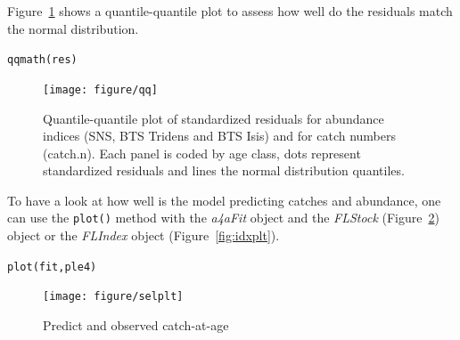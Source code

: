 \documentclass[a4paper,english,10pt]{article}\usepackage[]{graphicx}\usepackage[]{color}
\makeatletter
\newcommand{\hlstd}[1]{\textcolor[rgb]{0,0,0}{#1}}%
\newcommand{\hlkwd}[1]{\textcolor[rgb]{0.361,0.506,0.596}{#1}}%
\newenvironment{kframe}{%
 \def\at@end@of@kframe{}%
 \ifinner\ifhmode%
  \def\at@end@of@kframe{\end{minipage}}%
  \begin{minipage}{\columnwidth}%
 \fi\fi%
 \def\FrameCommand##1{\hskip\@totalleftmargin \hskip-\fboxsep
 \colorbox{shadecolor}{##1}\hskip-\fboxsep
     \hskip-\linewidth \hskip-\@totalleftmargin \hskip\columnwidth}%
 \MakeFramed {\advance\hsize-\width
   \@totalleftmargin\z@ \linewidth\hsize
   \@setminipage}}%
 {\par\unskip\endMakeFramed%
 \at@end@of@kframe}
\newenvironment{knitrout}{}{} %
\newcommand{\code}[1]{{\texttt{#1}}}
\newcommand{\class}[1]{{\textit{#1}}}
\makeatother
\begin{document}
Figure~\ref{fig:qq} shows a quantile-quantile plot to assess how well do the residuals match the normal distribution.

\begin{knitrout}
\color{fgcolor}\begin{kframe}
\begin{alltt}
\hlkwd{qqmath}\hlstd{(res)}
\end{alltt}
\end{kframe}\begin{figure}[H]


{\centering \texttt{[image: figure/qq]} 

}

\caption[Quantile-quantile plot of standardized residuals for abundance indices (SNS, BTS Tridens and BTS Isis) and for catch numbers (catch]{Quantile-quantile plot of standardized residuals for abundance indices (SNS, BTS Tridens and BTS Isis) and for catch numbers (catch.n). Each panel is coded by age class, dots represent standardized residuals and lines the normal distribution quantiles.\label{fig:qq}}
\end{figure}


\end{knitrout}

To have a look at how well is the model predicting catches and abundance, one can use the \code{plot()} method with the \class{a4aFit} object and the \class{FLStock} (Figure~\ref{fig:selplt}) object or the \class{FLIndex} object (Figure~\ref{fig:idxplt}).

\begin{knitrout}
\color{fgcolor}\begin{kframe}
\begin{alltt}
\hlkwd{plot}\hlstd{(fit, ple4)}
\end{alltt}
\end{kframe}\begin{figure}[H]


{\centering \texttt{[image: figure/selplt]} 

}

\caption[Predict and observed catch-at-age]{Predict and observed catch-at-age\label{fig:selplt}}
\end{figure}


\end{knitrout}
\end{document}
